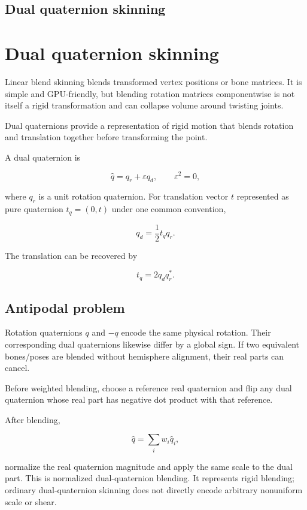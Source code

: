 \hypertarget{appendix-921f3f2efb53}{}
\section*{Dual quaternion skinning}
\chapter{Dual quaternion skinning}\label{appendix-921f3f2efb53-dual-quaternion-skinning}

Linear blend skinning blends transformed vertex positions or bone matrices. It is simple and GPU-friendly, but blending rotation matrices componentwise is not itself a rigid transformation and can collapse volume around twisting joints.

Dual quaternions provide a representation of rigid motion that blends rotation and translation together before transforming the point.

A dual quaternion is

\[
\hat q=q_r+\varepsilon q_d,
\qquad \varepsilon^2=0,
\]

where \(q_r\) is a unit rotation quaternion. For translation vector \(t\) represented as pure quaternion \(t_q=(0,t)\) under one common convention,

\[
q_d=\frac12 t_q q_r.
\]

The translation can be recovered by

\[
t_q=2q_dq_r^*.
\]

\section{Antipodal problem}\label{appendix-921f3f2efb53-antipodal-problem}

Rotation quaternions \(q\) and \(-q\) encode the same physical rotation. Their corresponding dual quaternions likewise differ by a global sign. If two equivalent bones/poses are blended without hemisphere alignment, their real parts can cancel.

Before weighted blending, choose a reference real quaternion and flip any dual quaternion whose real part has negative dot product with that reference.

After blending,

\[
\hat q = \sum_i w_i \hat q_i,
\]

normalize the real quaternion magnitude and apply the same scale to the dual part. This is normalized dual-quaternion blending. It represents rigid blending; ordinary dual-quaternion skinning does not directly encode arbitrary nonuniform scale or shear.

